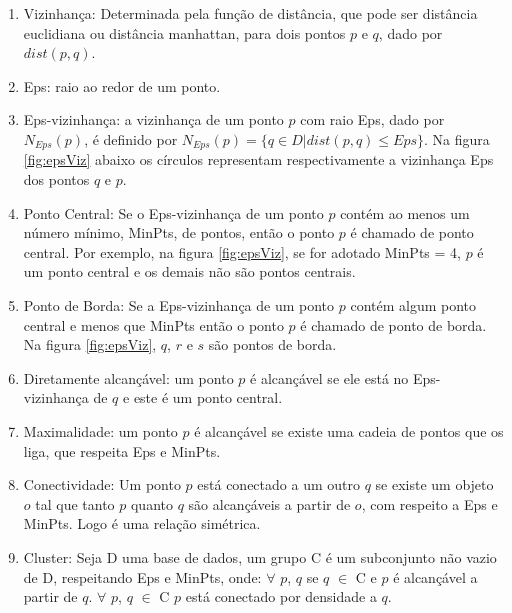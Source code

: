 \begin{enumerate}
	\item Vizinhança: Determinada pela função de distância, que pode ser distância euclidiana ou distância manhattan, para dois pontos ${p}$ e ${q}$, dado por ${dist(p,q)}$.
	\item Eps: raio ao redor de um ponto. 
	\item Eps-vizinhança: a vizinhança de um ponto ${p}$ com raio Eps, dado por ${N_{Eps}(p)}$, é definido por ${N_{Eps}(p) = \big\{ q \in D | dist(p, q)  \leqslant Eps\big\} }$. Na figura \ref{fig:epsViz} abaixo os círculos representam respectivamente a vizinhança Eps dos pontos ${q}$ e ${p}$.
	\item Ponto Central: Se o Eps-vizinhança de um ponto ${p}$ contém ao menos um número mínimo, MinPts, de pontos, então o ponto ${p}$ é chamado de ponto central.
	Por exemplo, na figura \ref{fig:epsViz}, se for adotado MinPts = 4, ${p}$ é um ponto central e os demais não são pontos centrais.
	\item Ponto de Borda: Se a Eps-vizinhança de um ponto ${p}$ contém algum ponto central e menos que MinPts então o ponto ${p}$ é chamado de ponto de borda. Na figura  \ref{fig:epsViz}, ${q}$, ${r}$ e ${s}$ são pontos de borda.
	\item Diretamente alcançável: um ponto ${p}$ é alcançável se ele está no Eps-vizinhança de ${q}$ e este é um ponto central.
	\item Maximalidade: um ponto ${p}$ é alcançável se existe uma cadeia de pontos que os liga, que respeita Eps e MinPts.
	\item Conectividade: Um ponto ${p}$ está conectado a um outro ${q}$ se existe um objeto ${o}$ tal que tanto ${p}$ quanto ${q}$ são alcançáveis a partir de ${o}$, com respeito a Eps e MinPts. Logo é uma relação simétrica.
	\item Cluster: Seja D uma base de dados, um grupo C é um subconjunto não vazio de D, respeitando Eps e MinPts, onde:
		\subitem ${\forall}$ ${p}$, ${q}$ se ${q}$ ${\in}$ C e ${p}$ é alcançável a partir de ${q}$.
		\subitem ${\forall}$ ${p}$, ${q}$ ${\in}$ C ${p}$ está conectado por densidade a ${q}$.
\end{enumerate}

\begin{figure}[!ht]
	\centering
\end{figure}

